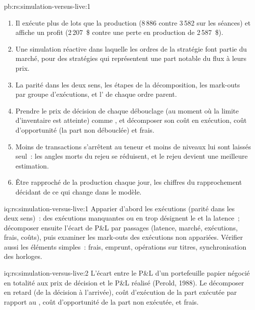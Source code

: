 \begin{solution}{pb:rs:simulation-versus-live:1}
\begin{enumerate}
\item Il exécute plus de lots que la production (8\,886 contre 3\,582 sur les séances) et affiche un profit (2\,207~\$ contre une perte en production de 2\,587~\$).
\item Une simulation réactive dans laquelle les ordres de la stratégie font partie du marché, pour des stratégies qui représentent une part notable du flux à leurs prix.
\item La parité dans les deux sens, les étapes de la décomposition, les mark-outs par groupe d'exécutions, et l' de chaque ordre parent.
\item Prendre le prix de décision de chaque débouclage (au moment où la limite d'inventaire est atteinte) comme , et décomposer son coût en exécution, coût d'opportunité (la part non débouclée) et frais.
\item Moins de transactions s'arrêtent au teneur et moins de niveaux lui sont laissés seul~: les angles morts du rejeu se réduisent, et le rejeu devient une meilleure estimation.
\item Être rapproché de la production chaque jour, les chiffres du rapprochement décidant de ce qui change dans le modèle.
\end{enumerate}
\end{solution}

\begin{solution}{iq:rs:simulation-versus-live:1}
Apparier d'abord les exécutions (parité dans les deux sens)~: des exécutions manquantes ou en trop désignent le  et la latence~; décomposer ensuite l'écart de P\&L par passages (latence, marché, exécutions, frais, coûts),
puis examiner les mark-outs des exécutions non appariées. Vérifier aussi les éléments simples~: frais, emprunt, opérations sur titres, synchronisation des horloges.
\end{solution}

\begin{solution}{iq:rs:simulation-versus-live:2}
L'écart entre le P\&L d'un portefeuille papier négocié en totalité aux prix de décision et le P\&L réalisé (Perold, 1988). Le décomposer en retard (de la décision à l'arrivée),
coût d'exécution de la part exécutée par rapport au , coût d'opportunité de la part non exécutée, et frais.
\end{solution}

